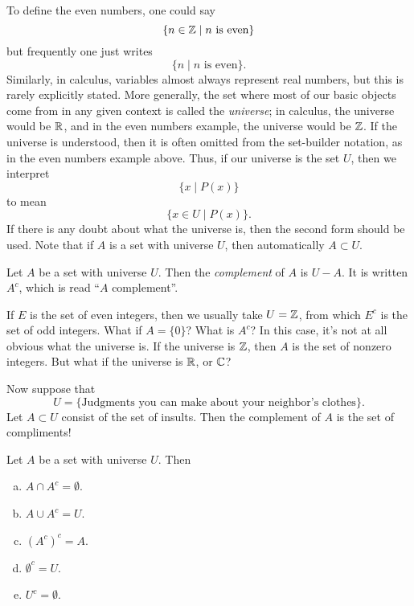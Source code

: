 \documentclass{tufte-book}
\begin{document}
To define the even numbers, one could say
\[
\{n \in \mathbb{Z}  \mid  n \text{ is even}\}
\]
but frequently one just writes
\[
\{n  \mid  n \text{ is even}\}.
\]
Similarly, in calculus, variables almost always represent real numbers, but this is rarely explicitly stated. More generally, the set where most of our basic objects come from in any given context is called the \emph{universe}; in calculus, the universe would be $\mathbb{R}$, and in the even numbers example, the universe would be $\mathbb{Z}$. If the universe is understood, then it is often omitted from the set-builder notation, as in the even numbers example above. Thus, if our universe is the set $U$, then we interpret
\[
\{x  \mid  P(x)\} 
\]
to mean
\[
\{x \in U  \mid  P(x)\}.
\]
If there is any doubt about what the universe is, then the second form should be used. Note that if $A$ is a set with universe $U$, then automatically $A \subset U$.

\begin{definition}
  Let $A$ be a set with universe $U$. Then the \emph{complement} of $A$ is $U - A$. It is written $A^c$, which is read ``$A$ complement''.
\end{definition}

If $E$ is the set of even integers, then we usually take $U = \mathbb{Z}$, from which $E^c$ is the set of odd integers. What if $A = \{0\}$? What is $A^c$? In this case, it's not at all obvious what the universe is. If the universe is $\mathbb{Z}$, then $A$ is the set of nonzero integers. But what if the universe is $\mathbb{R}$, or $\mathbb{C}$?

Now suppose that 
\[
U = \{\text{Judgments you can make about your neighbor's clothes}\}.
\]
Let $A \subset U$ consist of the set of insults. Then the complement of $A$ is the set of compliments!

\begin{proposition}\label{prop:complements}
  Let $A$ be a set with universe $U$. Then
  \begin{enumerate}[(a)]
      \item $A \cap A^c = \emptyset$.
      \item $A \cup A^c = U$.
      \item $(A^c)^c = A$.
      \item $\emptyset^c = U$.
      \item $U^c = \emptyset$.
  \end{enumerate}
\end{proposition}
\end{document}
